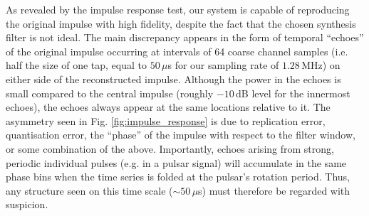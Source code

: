 \documentclass{pasa}%
\begin{document}
As revealed by the impulse response test, our system is capable of reproducing the original impulse with high fidelity, despite the fact that the chosen synthesis filter is not ideal.
The main discrepancy appears in the form of temporal ``echoes'' of the original impulse occurring at intervals of 64 coarse channel samples (i.e. half the size of one tap, equal to $50\,\mu$s for our sampling rate of $1.28\,$MHz) on either side of the reconstructed impulse.
Although the power in the echoes is small compared to the central impulse (roughly $-10\,$dB level for the innermost echoes), the echoes always appear at the same locations relative to it.
The asymmetry seen in Fig. \ref{fig:impulse_response} is due to replication error, quantisation error, the ``phase'' of the impulse with respect to the filter window, or some combination of the above.
Importantly, echoes arising from strong, periodic individual pulses (e.g. in a pulsar signal) will accumulate in the same phase bins when the time series is folded at the pulsar's rotation period.
Thus, any structure seen on this time scale ($\sim 50\,\mu$s) must therefore be regarded with suspicion.
\end{document}
